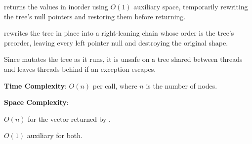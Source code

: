 \begin{compactitem}
  \item {} returns the values in inorder using $O(1)$ auxiliary space, temporarily rewriting the tree's null pointers and restoring them before returning.
  \item {} rewrites the tree in place into a right-leaning chain whose order is the tree's preorder, leaving every left pointer null and destroying the original shape.
\end{compactitem}

Since  mutates the tree as it runs, it is unsafe on a tree shared between threads and leaves threads behind if an exception escapes.

\textbf{Time Complexity}: $O(n)$ per call, where $n$ is the number of nodes.

\textbf{Space Complexity}:
\begin{compactitem}
  \item $O(n)$ for the vector returned by .
  \item $O(1)$ auxiliary for both.
\end{compactitem}

